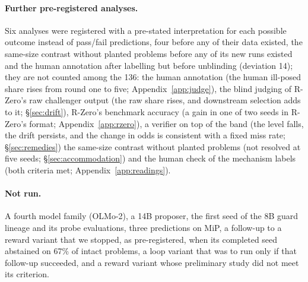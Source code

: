 \paragraph{Further pre-registered analyses.} Six analyses were registered with a pre-stated interpretation for each possible outcome instead of pass/fail predictions, four before any of their data existed, the same-size contrast without planted problems before any of its new runs existed and the human annotation after labelling but before unblinding (deviation 14); they are not counted among the 136: the human annotation (the human ill-posed share rises from round one to five; Appendix~\ref{app:judge}), the blind judging of R-Zero's raw challenger output (the raw share rises, and downstream selection adds to it; \S\ref{sec:drift}), R-Zero's benchmark accuracy (a gain in one of two seeds in R-Zero's format; Appendix~\ref{app:rzero}), a verifier on top of the band (the level falls, the drift persists, and the change in odds is consistent with a fixed miss rate; \S\ref{sec:remedies}) the same-size contrast without planted problems (not resolved at five seeds; \S\ref{sec:accommodation}) and the human check of the mechanism labels (both criteria met; Appendix~\ref{app:readings}).

\paragraph{Not run.} A fourth model family (OLMo-2), a 14B proposer, the first seed of the 8B guard lineage and its probe evaluations, three predictions on MiP, a follow-up to a reward variant that we stopped, as pre-registered, when its completed seed abstained on 67\% of intact problems, a loop variant that was to run only if that follow-up succeeded, and a reward variant whose preliminary study did not meet its criterion.

